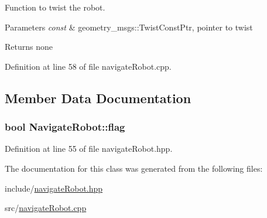 Function to twist the robot. 


\begin{DoxyParams}{Parameters}
{\em const} & geometry\+\_\+msgs\+::\+Twist\+Const\+Ptr, pointer to twist \\
\hline
\end{DoxyParams}
\begin{DoxyReturn}{Returns}
none 
\end{DoxyReturn}


Definition at line 58 of file navigate\+Robot.\+cpp.



\subsection{Member Data Documentation}
\subsubsection[{\texorpdfstring{flag}{flag}}]{\setlength{\rightskip}{0pt plus 5cm}bool Navigate\+Robot\+::flag}\hypertarget{class_navigate_robot_a6eadd58c6c56d73ff90e3d7ebd94bb3d}{}\label{class_navigate_robot_a6eadd58c6c56d73ff90e3d7ebd94bb3d}


Definition at line 55 of file navigate\+Robot.\+hpp.



The documentation for this class was generated from the following files\+:\begin{DoxyCompactItemize}
\item 
include/\hyperlink{navigate_robot_8hpp}{navigate\+Robot.\+hpp}\item 
src/\hyperlink{navigate_robot_8cpp}{navigate\+Robot.\+cpp}\end{DoxyCompactItemize}
